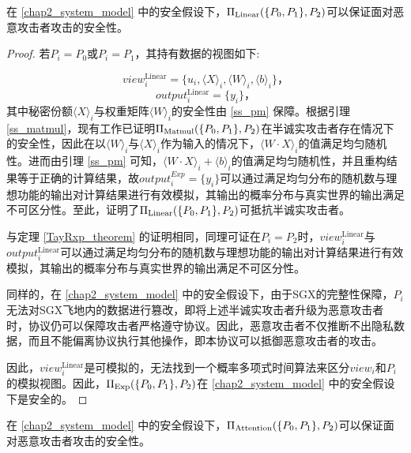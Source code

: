 \begin{theorem}
	\label{Linear_theorem}
	在 \ref{chap2_system_model} 中的安全假设下，$\Pi_{\rm Linear}(\{P_0, P_1\}, P_2)$可以保证面对恶意攻击者攻击的安全性。
\end{theorem}

\begin{proof}
	若$P_i=P_0$或$P_i=P_1$，其持有数据的视图如下:
	
	$$view_i^{\text{Linear}}=\{u_i, \langle X\rangle_i,\langle W\rangle_i, \langle b\rangle_i\}\text{，}$$
	$$output_i^{\text{Linear}}=\{y_i\}\text{，}$$
	其中秘密份额$\langle X\rangle_i$与权重矩阵$\langle W\rangle_i$的安全性由 \ref{ss_pm} 保障。根据引理 \ref{ss_matmul}，现有工作已证明$\Pi_{\rm Matmul}(\{P_0, P_1\}, P_2)$在半诚实攻击者存在情况下的安全性，因此在以$\langle W\rangle_i$与$\langle X\rangle_i$作为输入的情况下，$\langle W\cdot X\rangle_i$的值满足均匀随机性。进而由引理 \ref{ss_pm} 可知，$\langle W\cdot X\rangle_i + \langle b\rangle_i$的值满足均匀随机性，并且重构结果等于正确的计算结果，故$output_i^{Exp}=\{y_i\}$可以通过满足均匀分布的随机数与理想功能的输出对计算结果进行有效模拟，其输出的概率分布与真实世界的输出满足不可区分性。至此，证明了$\Pi_{\rm Linear}(\{P_0, P_1\}, P_2)$可抵抗半诚实攻击者。
	
	与定理 \ref{TayRxp_theorem} 的证明相同，同理可证在$P_i=P_2$时，$view_i^{\text{Linear}}$与$output_i^{\text{Linear}}$可以通过满足均匀分布的随机数与理想功能的输出对计算结果进行有效模拟，其输出的概率分布与真实世界的输出满足不可区分性。
	
	同样的，在 \ref{chap2_system_model} 中的安全假设下，由于SGX的完整性保障\cite{SGX_Explained}，$P_i$无法对SGX飞地内的数据进行篡改，即将上述半诚实攻击者升级为恶意攻击者时，协议仍可以保障攻击者严格遵守协议。因此，恶意攻击者不仅推断不出隐私数据，而且不能偏离协议执行其他操作，即本协议可以抵御恶意攻击者的攻击。
	
	因此，$view_i^{\text{Linear}}$是可模拟的，无法找到一个概率多项式时间算法来区分$view_i$和$P_i$的模拟视图。因此，$\Pi_{\rm Exp}(\{P_0, P_1\}, P_2)$在 \ref{chap2_system_model} 中的安全假设下是安全的。

\end{proof}

\begin{theorem}
	\label{Attention_theorem}
	在 \ref{chap2_system_model} 中的安全假设下，$\Pi_{\rm Attention}(\{P_0, P_1\}, P_2)$可以保证面对恶意攻击者攻击的安全性。
\end{theorem}

